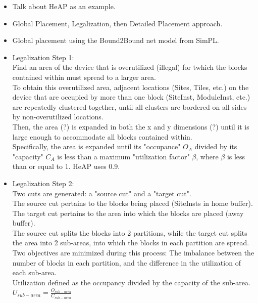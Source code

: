 \documentclass[twocolumn]{article}
\begin{document}
    \begin{itemize}
        \item Talk about HeAP as an example.
        \item Global Placement, Legalization, then Detailed Placement approach.
        \item Global placement using the Bound2Bound net model from SimPL.
        \item Legalization Step 1: \\
            Find an area of the device that is overutilized (illegal) for twhich the blocks contained within must spread to a larger area. \\
            To obtain this overutilized area, adjacent locations (Sites, Tiles, etc.) on the device that are occupied by more than one block (SiteInst, ModuleInst, etc.) are repeatedly clustered together, until all clusters are bordered on all sides by non-overutilized locations. \\ 
            Then, the area (?) is expanded in both the x and y dimensions (?) until it is large enough to accommodate all blocks contained within. \\
            Specifically, the area is expanded until its "occupance" \(O_A\) divided by its "capacity" \(C_A\) is less than a maximum "utilization factor" $\beta$, where $\beta$ is less than or equal to 1. HeAP uses 0.9.
        \item Legalization Step 2: \\
            Two cuts are generated: a "source cut" and a "target cut". \\
            The source cut pertains to the blocks being placed (SiteInsts in home buffer). \\ 
            The target cut pertains to the area into which the blocks are placed (away buffer). \\
            The source cut splits the blocks into 2 partitions, while the target cut splits the area into 2 sub-areas, into which the blocks in each partition are spread. \\
            Two objectives are minimized during this process: The imbalance between the number of blocks in each partition, and the difference in the utilization of each sub-area. \\
            Utilization defined as the occupancy divided by the capacity of the sub-area. \\
            \(U_{sub-area} = \frac{O_{sub-area}}{C_{sub-area}}\) \\

\end{itemize}
\end{document}
